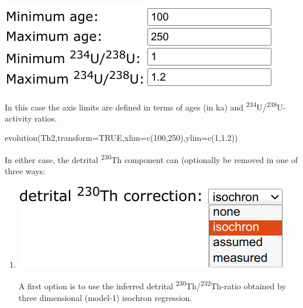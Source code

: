 \begin{refsection}
\begin{enumerate}
  \noindent\begin{minipage}[t]{.4\linewidth}
  \strut\vspace*{-\baselineskip}\newline
  \includegraphics[width=\linewidth]{../figures/ThUvsAgeLimits.png}
  \end{minipage}
  \begin{minipage}[t]{.6\linewidth}
    In this case the axis limits are defined in terms of ages (in ka)
    and \textsuperscript{234}U/\textsuperscript{238}U-activity ratios.
  \end{minipage}

\begin{console}
evolution(Th2,transform=TRUE,xlim=c(100,250),ylim=c(1,1.2))
\end{console}

  In either case, the detrital \textsuperscript{230}Th component can
  (optionally be removed in one of three ways:

\begin{enumerate}
  \item \begin{minipage}[t]{.4\linewidth}
    \strut\vspace*{-\baselineskip}\newline
    \includegraphics[width=\linewidth]{../figures/ThUdetritalisochroncorr.png}
  \end{minipage}
    \begin{minipage}[t]{.6\linewidth}
      A first option is to use the inferred detrital
      \textsuperscript{230}Th/\textsuperscript{232}Th-ratio obtained
      by three dimensional (model-1) isochron regression.
    \end{minipage}


\end{enumerate}
\end{enumerate}
\end{refsection}
